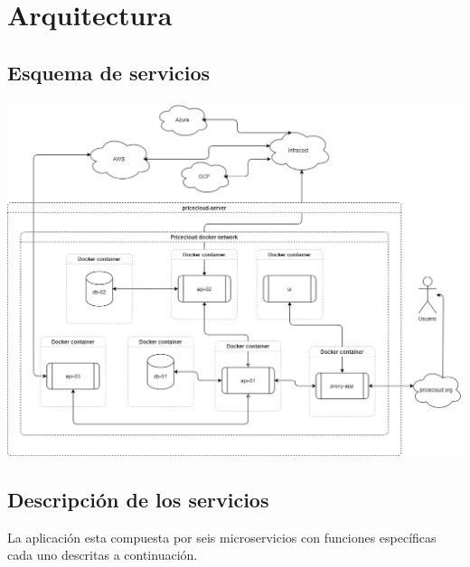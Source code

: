 \chapter{Arquitectura} %

\label{ch:arquitectura} %


\section{Esquema de servicios}

\begin{center}
    \includegraphics[width=\textwidth]{gfx/services.drawio.png}
\end{center}

\section{Descripción de los servicios}
La aplicación esta compuesta por seis microservicios con funciones específicas cada uno descritas a continuación.

